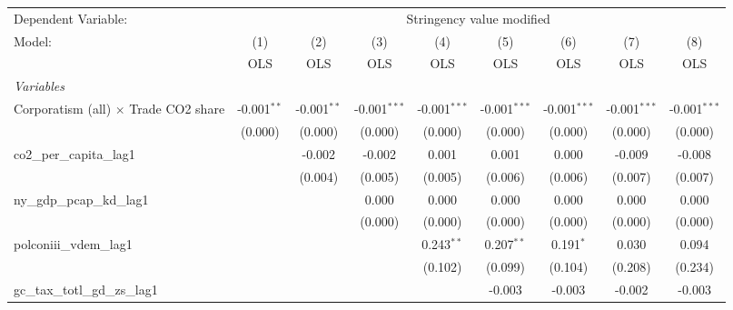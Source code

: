 
\begingroup
\centering
\begin{tabular}{lcccccccc}
   \toprule
   Dependent Variable: & \multicolumn{8}{c}{Stringency value modified}\\
   Model:                                      & (1)           & (2)           & (3)            & (4)            & (5)            & (6)            & (7)            & (8)\\  
                                               &  OLS          & OLS           & OLS            & OLS            & OLS            & OLS            & OLS            & OLS\\  
   \midrule
   \emph{Variables}\\
   Corporatism (all) $\times$ Trade CO2 share  & -0.001$^{**}$ & -0.001$^{**}$ & -0.001$^{***}$ & -0.001$^{***}$ & -0.001$^{***}$ & -0.001$^{***}$ & -0.001$^{***}$ & -0.001$^{***}$\\   
                                               & (0.000)       & (0.000)       & (0.000)        & (0.000)        & (0.000)        & (0.000)        & (0.000)        & (0.000)\\   
   co2\_per\_capita\_lag1                      &               & -0.002        & -0.002         & 0.001          & 0.001          & 0.000          & -0.009         & -0.008\\   
                                               &               & (0.004)       & (0.005)        & (0.005)        & (0.006)        & (0.006)        & (0.007)        & (0.007)\\   
   ny\_gdp\_pcap\_kd\_lag1                     &               &               & 0.000          & 0.000          & 0.000          & 0.000          & 0.000          & 0.000\\   
                                               &               &               & (0.000)        & (0.000)        & (0.000)        & (0.000)        & (0.000)        & (0.000)\\   
   polconiii\_vdem\_lag1                       &               &               &                & 0.243$^{**}$   & 0.207$^{**}$   & 0.191$^{*}$    & 0.030          & 0.094\\   
                                               &               &               &                & (0.102)        & (0.099)        & (0.104)        & (0.208)        & (0.234)\\   
   gc\_tax\_totl\_gd\_zs\_lag1                 &               &               &                &                & -0.003         & -0.003         & -0.002         & -0.003\\   

\end{tabular}
